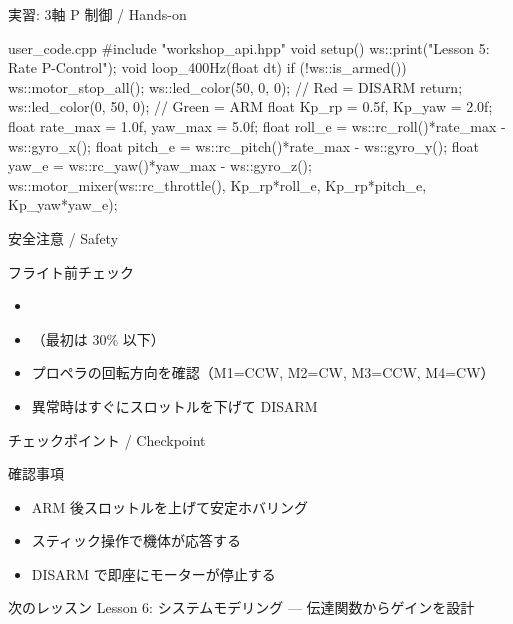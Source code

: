 \begin{frame}[fragile]{実習: 3軸 P 制御 / Hands-on}
  \begin{sflisting}{user\_code.cpp}
#include "workshop_api.hpp"
void setup() { ws::print("Lesson 5: Rate P-Control"); }
void loop_400Hz(float dt) {
    if (!ws::is_armed()) {
        ws::motor_stop_all();
        ws::led_color(50, 0, 0);  // Red = DISARM
        return;
    }
    ws::led_color(0, 50, 0);  // Green = ARM
    float Kp_rp = 0.5f, Kp_yaw = 2.0f;
    float rate_max = 1.0f, yaw_max = 5.0f;
    float roll_e  = ws::rc_roll()*rate_max  - ws::gyro_x();
    float pitch_e = ws::rc_pitch()*rate_max - ws::gyro_y();
    float yaw_e   = ws::rc_yaw()*yaw_max   - ws::gyro_z();
    ws::motor_mixer(ws::rc_throttle(),
        Kp_rp*roll_e, Kp_rp*pitch_e, Kp_yaw*yaw_e);
}
  \end{sflisting}
\end{frame}

\begin{frame}{安全注意 / Safety}
  \begin{alertblock}{フライト前チェック}
    \begin{itemize}
      \item[$\square$] 
      \item[$\square$] （最初は 30\% 以下）
      \item[$\square$] プロペラの回転方向を確認（M1=CCW, M2=CW, M3=CCW, M4=CW）
      \item[$\square$] 異常時はすぐにスロットルを下げて DISARM
    \end{itemize}
  \end{alertblock}
\end{frame}

\begin{frame}{チェックポイント / Checkpoint}
  \begin{alertblock}{確認事項}
    \begin{itemize}
      \item[$\square$] ARM 後スロットルを上げて安定ホバリング
      \item[$\square$] スティック操作で機体が応答する
      \item[$\square$] DISARM で即座にモーターが停止する
    \end{itemize}
  \end{alertblock}

  \vspace{1em}

  \begin{block}{次のレッスン}
    Lesson 6: システムモデリング --- 伝達関数からゲインを設計
  \end{block}
\end{frame}
